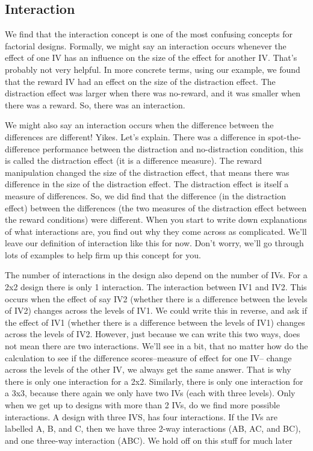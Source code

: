 \documentclass[
]{book}
\begin{document}
\hypertarget{interaction}{%
\subsection{Interaction}\label{interaction}}

We find that the interaction concept is one of the most confusing concepts for factorial designs. Formally, we might say an interaction occurs whenever the effect of one IV has an influence on the size of the effect for another IV. That's probably not very helpful. In more concrete terms, using our example, we found that the reward IV had an effect on the size of the distraction effect. The distraction effect was larger when there was no-reward, and it was smaller when there was a reward. So, there was an interaction.

We might also say an interaction occurs when the difference between the differences are different! Yikes. Let's explain. There was a difference in spot-the-difference performance between the distraction and no-distraction condition, this is called the distraction effect (it is a difference measure). The reward manipulation changed the size of the distraction effect, that means there was difference in the size of the distraction effect. The distraction effect is itself a measure of differences. So, we did find that the difference (in the distraction effect) between the differences (the two measures of the distraction effect between the reward conditions) were different. When you start to write down explanations of what interactions are, you find out why they come across as complicated. We'll leave our definition of interaction like this for now. Don't worry, we'll go through lots of examples to help firm up this concept for you.

The number of interactions in the design also depend on the number of IVs. For a 2x2 design there is only 1 interaction. The interaction between IV1 and IV2. This occurs when the effect of say IV2 (whether there is a difference between the levels of IV2) changes across the levels of IV1. We could write this in reverse, and ask if the effect of IV1 (whether there is a difference between the levels of IV1) changes across the levels of IV2. However, just because we can write this two ways, does not mean there are two interactions. We'll see in a bit, that no matter how do the calculation to see if the difference scores--measure of effect for one IV-- change across the levels of the other IV, we always get the same answer. That is why there is only one interaction for a 2x2. Similarly, there is only one interaction for a 3x3, because there again we only have two IVs (each with three levels). Only when we get up to designs with more than 2 IVs, do we find more possible interactions. A design with three IVS, has four interactions. If the IVs are labelled A, B, and C, then we have three 2-way interactions (AB, AC, and BC), and one three-way interaction (ABC). We hold off on this stuff for much later
\end{document}
